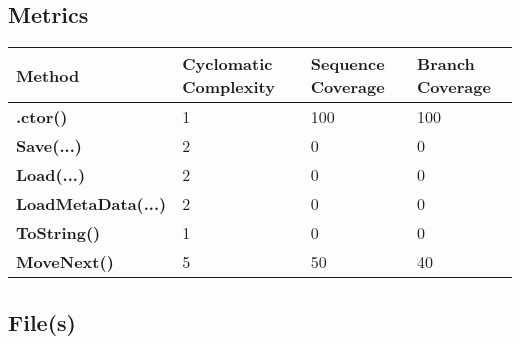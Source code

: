 \documentclass[a4paper,10pt]{article}
\begin{document}
\subsection{Metrics}
\begin{longtable}[l]{|l|l|l|l|}
\hline
\textbf{Method} & \textbf{Cyclomatic Complexity} & \textbf{Sequence Coverage} & \textbf{Branch Coverage}\\
\hline
\textbf{.ctor()} & 1 & 100 & 100\\
\hline
\textbf{Save(...)} & 2 & 0 & 0\\
\hline
\textbf{Load(...)} & 2 & 0 & 0\\
\hline
\textbf{LoadMetaData(...)} & 2 & 0 & 0\\
\hline
\textbf{ToString()} & 1 & 0 & 0\\
\hline
\textbf{MoveNext()} & 5 & 50 & 40\\
\hline
\end{longtable}
\subsection{File(s)}
\end{document}
